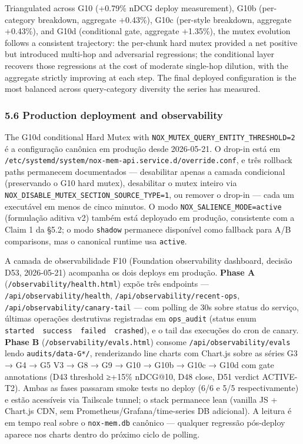 \documentclass[
]{article}
\begin{document}
Triangulated across G10 (+0.79\% nDCG deploy measurement), G10b
(per-category breakdown, aggregate +0.43\%), G10c (per-style breakdown,
aggregate +0.43\%), and G10d (conditional gate, aggregate +1.35\%), the
mutex evolution follows a consistent trajectory: the per-chunk hard
mutex provided a net positive but introduced multi-hop and adversarial
regressions; the conditional layer recovers those regressions at the
cost of moderate single-hop dilution, with the aggregate strictly
improving at each step. The final deployed configuration is the most
balanced across query-category diversity the series has measured.

\subsubsection{5.6 Production deployment and
observability}\label{production-deployment-and-observability}

The G10d conditional Hard Mutex with
\texttt{NOX\_MUTEX\_QUERY\_ENTITY\_THRESHOLD=2} é a configuração
canônica em produção desde 2026-05-21. O drop-in está em
\texttt{/etc/systemd/system/nox-mem-api.service.d/override.conf}, e três
rollback paths permanecem documentados --- desabilitar apenas a camada
condicional (preservando o G10 hard mutex), desabilitar o mutex inteiro
via \texttt{NOX\_DISABLE\_MUTEX\_SECTION\_SOURCE\_TYPE=1}, ou remover o
drop-in --- cada um executável em menos de cinco minutos. O modo
\texttt{NOX\_SALIENCE\_MODE=active} (formulação aditiva v2) também está
deployado em produção, consistente com a Claim 1 da §5.2; o modo
\texttt{shadow} permanece disponível como fallback para A/B comparisons,
mas o canonical runtime usa \texttt{active}.

A camada de observabilidade F10 (Foundation observability dashboard,
decisão D53, 2026-05-21) acompanha os dois deploys em produção.
\textbf{Phase A} (\texttt{/observability/health.html}) expõe três
endpoints --- \texttt{/api/observability/health},
\texttt{/api/observability/recent-ops},
\texttt{/api/observability/canary-tail} --- com polling de 30s sobre
status do serviço, últimas operações destrutivas registradas em
\texttt{ops\_audit} (status enum
\texttt{started\ \textbar{}\ success\ \textbar{}\ failed\ \textbar{}\ crashed}),
e o tail das execuções do cron de canary. \textbf{Phase B}
(\texttt{/observability/evals.html}) consome
\texttt{/api/observability/evals} lendo \texttt{audits/data-G*/},
renderizando line charts com Chart.js sobre as séries G3 → G4 → G5 V3 →
G8 → G9 → G10 → G10b → G10c → G10d com gate annotations (D43 threshold
≥+15\% nDCG@10, D48 close, D51 verdict ACTIVE-T2). Ambas as fases
passaram smoke tests no deploy (6/6 e 5/5 respectivamente) e estão
acessíveis via Tailscale tunnel; o stack permanece lean (vanilla JS +
Chart.js CDN, sem Prometheus/Grafana/time-series DB adicional). A
leitura é em tempo real sobre o \texttt{nox-mem.db} canônico ---
qualquer regressão pós-deploy aparece nos charts dentro do próximo ciclo
de polling.
\end{document}
